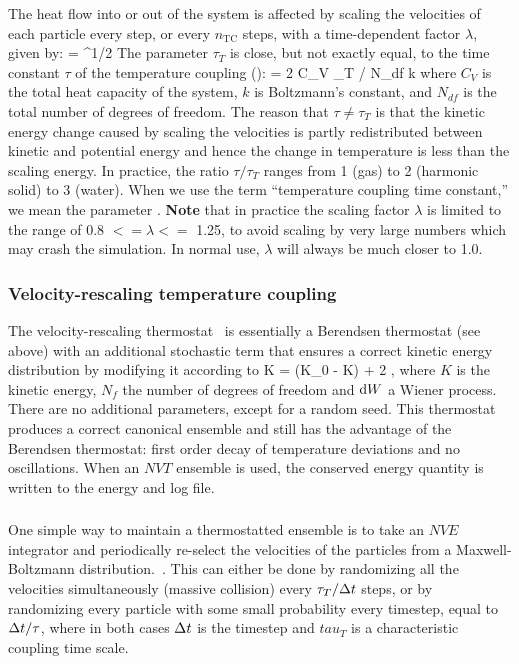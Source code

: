 The heat flow into or out of the system is affected by scaling the
velocities of each particle every step, or every $n_\mathrm{TC}$ steps,
with a time-dependent factor $\lambda$, given by:
\beq 
\lambda = ^{1/2}
\label{eqn:lambda}
\eeq
The parameter $\tau_T$ is close, but not exactly equal, to the time constant
$\tau$ of the temperature coupling ():
\beq
\tau = 2 C_V \tau_T / N_{df} k
\eeq
where $C_V$ is the total heat capacity of the system, $k$ is Boltzmann's
constant, and $N_{df}$ is the total number of degrees of freedom. The
reason that $\tau \neq \tau_T$ is that the kinetic energy change
caused by scaling the velocities is partly redistributed between
kinetic and potential energy and hence the change in temperature is
less than the scaling energy.  In practice, the ratio $\tau / \tau_T$
ranges from 1 (gas) to 2 (harmonic solid) to 3 (water). When we use
the term ``temperature coupling time constant,'' we mean the parameter
.  
{\bf Note} that in practice the scaling factor $\lambda$ is limited to 
the range of 0.8 $<= \lambda <=$ 1.25, to avoid scaling by very large
numbers which may crash the simulation. In normal use, 
$\lambda$ will always be much closer to 1.0.

\subsubsection{Velocity-rescaling temperature coupling}
The velocity-rescaling thermostat~\cite{Bussi2007a} is essentially a Berendsen
thermostat (see above) with an additional stochastic term that ensures
a correct kinetic energy distribution by modifying it according to
\beq
\de K = (K_0 - K)  + 2  ,
\label{eqn:vrescale}
\eeq
where $K$ is the kinetic energy, $N_f$ the number of degrees of freedom and $\mbox{d} W$ a Wiener process.
There are no additional parameters, except for a random seed.
This thermostat produces a correct canonical ensemble and still has
the advantage of the Berendsen thermostat: first order decay of
temperature deviations and no oscillations.
When an $NVT$ ensemble is used, the conserved energy quantity
is written to the energy and log file.  

\subsubsection{}
One simple way to maintain a thermostatted ensemble is to take an
$NVE$ integrator and periodically re-select the velocities of the
particles from a Maxwell-Boltzmann distribution.~\cite{Andersen80}.
This can either be done by randomizing all the velocities
simultaneously (massive collision) every $\tau_T/{\Delta t}$ steps, or by
randomizing every particle with some small probability every timestep,
equal to ${\Delta t}/\tau$, where in both cases ${\Delta t}$ is the timestep and
$tau_T$ is a characteristic coupling time scale.


